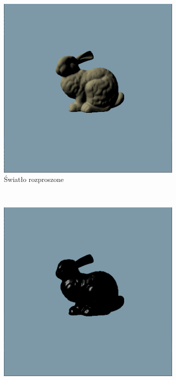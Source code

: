 \documentclass[a4paper,twoside,12pt]{book}
\begin{document}
\begin{figure}[H]
    \centering
    \begin{subfigure}[b]{0.3\textwidth}
        \includegraphics[width=\textwidth]{res/sum_diffuse.png}
        \caption{Światło rozproszone}
        \label{fig:sum_diffuse}
    \end{subfigure}
    ~ %
    \begin{subfigure}[b]{0.3\textwidth}
        \includegraphics[width=\textwidth]{res/sum_specular.png}

\end{subfigure}
\end{figure}
\end{document}

